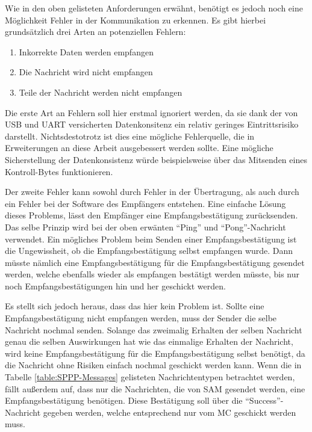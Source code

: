 Wie in den oben gelisteten Anforderungen erwähnt, benötigt es jedoch noch eine Möglichkeit Fehler in der Kommunikation zu erkennen.
Es gibt hierbei grundsätzlich drei Arten an potenziellen Fehlern:

\begin{enumerate}
    \item Inkorrekte Daten werden empfangen
    \item Die Nachricht wird nicht empfangen
    \item Teile der Nachricht werden nicht empfangen
\end{enumerate}

Die erste Art an Fehlern soll hier erstmal ignoriert werden, da sie dank der von USB und \ac{UART} versicherten Datenkonsitenz ein relativ geringes Eintrittsrisiko darstellt.
Nichtsdestotrotz ist dies eine mögliche Fehlerquelle, die in Erweiterungen an diese Arbeit ausgebessert werden sollte.
Eine mögliche Sicherstellung der Datenkonsistenz würde beispielsweise über das Mitsenden eines Kontroll-Bytes funktionieren.

Der zweite Fehler kann sowohl durch Fehler in der Übertragung, als auch durch ein Fehler bei der Software des Empfängers entstehen.
Eine einfache Lösung dieses Problems, lässt den Empfänger eine Empfangsbestätigung zurücksenden.
Das selbe Prinzip wird bei der oben erwänten \enquote{Ping} und \enquote{Pong}-Nachricht verwendet.
Ein mögliches Problem beim Senden einer Empfangsbestätigung ist die Ungewissheit, ob die Empfangsbestätigung selbst empfangen wurde.
Dann müsste nämlich eine Empfangsbestätigung für die Empfangsbestätigung gesendet werden, welche ebenfalls wieder als empfangen bestätigt werden müsste, bis nur noch Empfangsbestätigungen hin und her geschickt werden.

Es stellt sich jedoch heraus, dass das hier kein Problem ist.
Sollte eine Empfangsbestätigung nicht empfangen werden, muss der Sender die selbe Nachricht nochmal senden.
Solange das zweimalig Erhalten der selben Nachricht genau die selben Auswirkungen hat wie das einmalige Erhalten der Nachricht, wird keine Empfangsbestätigung für die Empfangsbestätigung selbst benötigt, da die Nachricht ohne Risiken einfach nochmal geschickt werden kann.
Wenn die in Tabelle \ref{table:SPPP-Messages} gelisteten Nachrichtentypen betrachtet werden, fällt außerdem auf, dass nur die Nachrichten, die von \ac{SAM} gesendet werden, eine Empfangsbestätigung benötigen.
Diese Bestätigung soll über die \enquote{Success}-Nachricht gegeben werden, welche entsprechend nur vom \ac{MC} geschickt werden muss.

